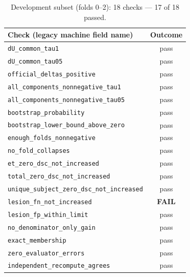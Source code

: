 \documentclass[runningheads]{llncs}
\begin{document}
\begin{table}[htbp]\centering
\caption{Development subset (folds 0--2): 18 checks --- 17 of 18 passed.}
\begin{tabular}{@{}lc@{}}
\toprule
Check (legacy machine field name) & Outcome \\
\midrule
\texttt{dU\_common\_tau1} & pass \\
\texttt{dU\_common\_tau05} & pass \\
\texttt{official\_deltas\_positive} & pass \\
\texttt{all\_components\_nonnegative\_tau1} & pass \\
\texttt{all\_components\_nonnegative\_tau05} & pass \\
\texttt{bootstrap\_probability} & pass \\
\texttt{bootstrap\_lower\_bound\_above\_zero} & pass \\
\texttt{enough\_folds\_nonnegative} & pass \\
\texttt{no\_fold\_collapses} & pass \\
\texttt{et\_zero\_dsc\_not\_increased} & pass \\
\texttt{total\_zero\_dsc\_not\_increased} & pass \\
\texttt{unique\_subject\_zero\_dsc\_not\_increased} & pass \\
\texttt{lesion\_fn\_not\_increased} & \textbf{FAIL} \\
\texttt{lesion\_fp\_within\_limit} & pass \\
\texttt{no\_denominator\_only\_gain} & pass \\
\texttt{exact\_membership} & pass \\
\texttt{zero\_evaluator\_errors} & pass \\
\texttt{independent\_recompute\_agrees} & pass \\
\bottomrule
\end{tabular}
\end{table}
\end{document}
